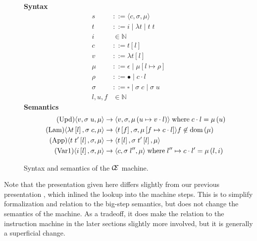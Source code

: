 \begin{figure}
\textbf{Syntax}
\begin{align*}
\tag{State} s &::= \langle c, \sigma, \mu \rangle \\
\tag{Term} t &::= i \; | \; \lambda t \; | \; t \; t  \\
\tag{Variable} i &\in \mathbb{N}  \\
\tag{Closure} c &::= t \left[l\right] \\
\tag{Value} v &::= \lambda t\left[l\right] \\
\tag{Heap} \mu &::= \epsilon \; | \; \mu \left[ l \mapsto \rho \right] \\
\tag{Environment} \rho &::= \bullet \; | \; c \cdot l \\
\tag{Stack} \sigma &::= \square \; | \; \sigma \; c \;  | \; \sigma \; u \\
\tag{Location} l,u,f &\in \mathbb{N}
\end{align*}
\textbf{Semantics}
\begin{align*}
\tag{Upd}
\langle v,  \sigma \; u , \mu \rangle 
  &\rightarrow
\langle v, \sigma, \mu\left(u \mapsto v \cdot l\right) \rangle  
\; \textnormal{where} \; c \cdot l = \mu\left(u\right) \\
\tag{Lam}
\langle \lambda t\left[l\right], \sigma \; c, \mu \rangle 
  &\rightarrow
\langle t\left[f\right], \sigma, \mu\left[f \mapsto c \cdot l\right]\rangle f
\not \in \textnormal{dom}\left(\mu\right)  \\
\tag{App}
\langle t \; t'\left[l\right], \sigma, \mu \rangle
  &\rightarrow
\langle t\left[l\right], \sigma \; t'\left[l\right], \mu \rangle \\
\tag{Var1}
\langle i\left[l\right], \sigma, \mu \rangle
  &\rightarrow
\langle c, \sigma \; l'', \mu \rangle
\; \textnormal{where} \; l'' \mapsto c \cdot l' = \mu\left(l, i\right)
\end{align*}
\caption{Syntax and semantics of the $\mathcal{\mathcal{C} \mskip -4mu \mathcal{E}}$ machine.}
\label{fig:cesm}
\end{figure}

Note that the presentation given here differs slightly from our previous
presentation \cite{cem}, which inlined the lookup into the machine steps. This
is to simplify formalization and relation to the big-step semantics, but does not
change the semantics of the machine. As a tradeoff, it does make the relation to
the instruction machine in the later sections slightly more involved, but
it is generally a superficial change.

